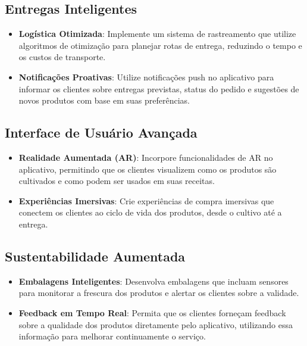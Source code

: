 \documentclass{article}
\begin{document}
\subsection{Entregas Inteligentes}
\begin{itemize}
    \item \textbf{Logística Otimizada}: Implemente um sistema de rastreamento que utilize algoritmos de otimização para planejar rotas de entrega, reduzindo o tempo e os custos de transporte.
    \item \textbf{Notificações Proativas}: Utilize notificações push no aplicativo para informar os clientes sobre entregas previstas, status do pedido e sugestões de novos produtos com base em suas preferências.
\end{itemize}

\subsection{Interface de Usuário Avançada}
\begin{itemize}
    \item \textbf{Realidade Aumentada (AR)}: Incorpore funcionalidades de AR no aplicativo, permitindo que os clientes visualizem como os produtos são cultivados e como podem ser usados em suas receitas.
    \item \textbf{Experiências Imersivas}: Crie experiências de compra imersivas que conectem os clientes ao ciclo de vida dos produtos, desde o cultivo até a entrega.
\end{itemize}

\subsection{Sustentabilidade Aumentada}
\begin{itemize}
    \item \textbf{Embalagens Inteligentes}: Desenvolva embalagens que incluam sensores para monitorar a frescura dos produtos e alertar os clientes sobre a validade.
    \item \textbf{Feedback em Tempo Real}: Permita que os clientes forneçam feedback sobre a qualidade dos produtos diretamente pelo aplicativo, utilizando essa informação para melhorar continuamente o serviço.
\end{itemize}
\end{document}
